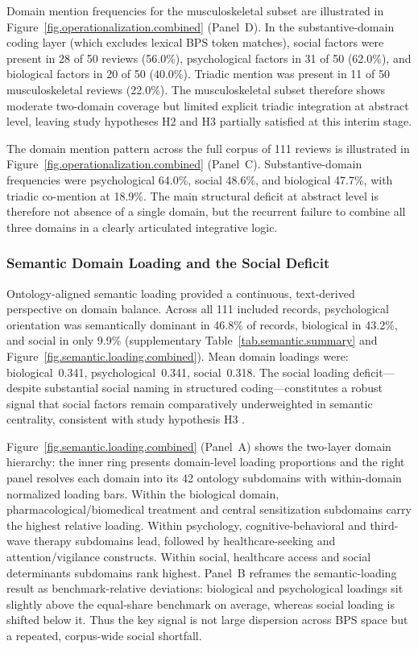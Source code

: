 \documentclass[11pt]{article}
\begin{document}
Domain mention frequencies for the musculoskeletal subset are illustrated in Figure~\ref{fig.operationalization.combined} (Panel~D). In the substantive-domain coding layer (which excludes lexical BPS token matches), social factors were present in 28 of 50 reviews (56.0\%), psychological factors in 31 of 50 (62.0\%), and biological factors in 20 of 50 (40.0\%). Triadic mention was present in 11 of 50 musculoskeletal reviews (22.0\%). The musculoskeletal subset therefore shows moderate two-domain coverage but limited explicit triadic integration at abstract level, leaving study hypotheses H2 and H3 partially satisfied at this interim stage.

The domain mention pattern across the full corpus of 111 reviews is illustrated in Figure~\ref{fig.operationalization.combined} (Panel~C). Substantive-domain frequencies were psychological 64.0\%, social 48.6\%, and biological 47.7\%, with triadic co-mention at 18.9\%. The main structural deficit at abstract level is therefore not absence of a single domain, but the recurrent failure to combine all three domains in a clearly articulated integrative logic.

\subsubsection*{Semantic Domain Loading and the Social Deficit}

Ontology-aligned semantic loading provided a continuous, text-derived perspective on domain balance. Across all 111 included records, psychological orientation was semantically dominant in 46.8\% of records, biological in 43.2\%, and social in only 9.9\% (supplementary Table~\ref{tab.semantic.summary} and Figure~\ref{fig.semantic.loading.combined}). Mean domain loadings were: biological~0.341, psychological~0.341, social~0.318. The social loading deficit---despite substantial social naming in structured coding---constitutes a robust signal that social factors remain comparatively underweighted in semantic centrality, consistent with study hypothesis H3 \citep{dorner2011, harkness2005, edwards2016}.

Figure~\ref{fig.semantic.loading.combined} (Panel~A) shows the two-layer domain hierarchy: the inner ring presents domain-level loading proportions and the right panel resolves each domain into its 42 ontology subdomains with within-domain normalized loading bars. Within the biological domain, pharmacological/biomedical treatment and central sensitization subdomains carry the highest relative loading. Within psychology, cognitive-behavioral and third-wave therapy subdomains lead, followed by healthcare-seeking and attention/vigilance constructs. Within social, healthcare access and social determinants subdomains rank highest. Panel~B reframes the semantic-loading result as benchmark-relative deviations: biological and psychological loadings sit slightly above the equal-share benchmark on average, whereas social loading is shifted below it. Thus the key signal is not large dispersion across BPS space but a repeated, corpus-wide social shortfall.
\end{document}
